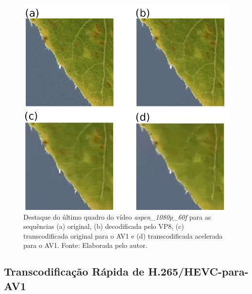 \begin{figure}
    \centering
    \includegraphics[width=\textwidth]{FIGURES/fig_35.png}
    \caption{Destaque do último quadro do vídeo \textit{aspen\_1080p\_60f} para as sequências (a) original, (b) decodificada pelo VP8, (c) transcodificada original para o AV1 e (d) transcodificada acelerada para o AV1. Fonte: Elaborada pelo autor.}
    \label{fig:35}
\end{figure}


\subsection{Transcodificação Rápida de H.265/HEVC-para-AV1}
\label{cap:7.5.4}


